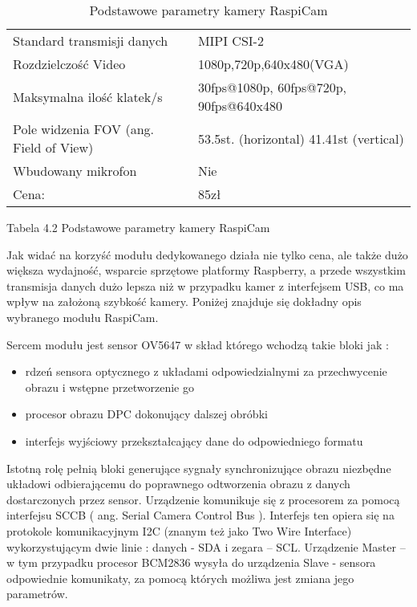 \begin{table}[hbt!]
\caption[Podstawowe parametry kamery RaspiCam]{Podstawowe parametry kamery RaspiCam}
\begin{tabularx}{\textwidth}{|l|X|} 
 \hline
Standard transmisji danych &	MIPI CSI-2 \\
Rozdzielczość Video &	1080p,720p,640x480(VGA) \\
Maksymalna ilość klatek/s &	30fps@1080p, 60fps@720p, 90fps@640x480 \\
Pole widzenia FOV (ang. Field of View) & 53.5st. (horizontal) 41.41st (vertical) \\
Wbudowany mikrofon &	Nie \\
Cena: &	85zł \\
\hline
\end{tabularx}  
\label{tab:compareAnalysers}
\end{table}


Tabela 4.2 Podstawowe parametry kamery RaspiCam

Jak widać na korzyść modułu dedykowanego działa nie tylko cena, ale także dużo większa wydajność, wsparcie sprzętowe platformy Raspberry, a przede wszystkim transmisja danych dużo lepsza niż w przypadku kamer z interfejsem USB, co ma wpływ na założoną szybkość kamery. Poniżej znajduje się dokładny opis wybranego modułu RaspiCam.
\begin{description}
\item Sercem modułu jest sensor OV5647 w skład którego wchodzą takie bloki jak :
\begin{itemize}
\item rdzeń sensora optycznego z układami odpowiedzialnymi za przechwycenie obrazu i wstępne przetworzenie go
\item procesor obrazu DPC dokonujący dalszej obróbki
\item interfejs wyjściowy przekształcający dane do odpowiedniego formatu
\end{itemize}
\end{description}
Istotną rolę pełnią bloki generujące sygnały synchronizujące obrazu niezbędne układowi odbierającemu do poprawnego odtworzenia obrazu z danych dostarczonych przez sensor.
Urządzenie komunikuje się z procesorem za pomocą interfejsu SCCB ( ang. Serial Camera Control Bus ). Interfejs ten opiera się na protokole komunikacyjnym I2C (znanym też jako Two Wire Interface) wykorzystującym dwie linie : danych - SDA i zegara – SCL. Urządzenie Master – w tym przypadku procesor BCM2836 wysyła do urządzenia Slave - sensora odpowiednie komunikaty, za pomocą których możliwa jest zmiana jego parametrów.
 

